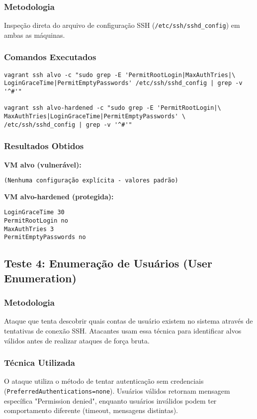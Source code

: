 \documentclass[12pt]{article}
\begin{document}
\subsubsection{Metodologia}
Inspeção direta do arquivo de configuração SSH (\texttt{/etc/ssh/sshd\_config}) em ambas as máquinas.

\subsubsection{Comandos Executados}
\begin{verbatim}
vagrant ssh alvo -c "sudo grep -E 'PermitRootLogin|MaxAuthTries|\
LoginGraceTime|PermitEmptyPasswords' /etc/ssh/sshd_config | grep -v '^#'"

vagrant ssh alvo-hardened -c "sudo grep -E 'PermitRootLogin|\
MaxAuthTries|LoginGraceTime|PermitEmptyPasswords' \
/etc/ssh/sshd_config | grep -v '^#'"
\end{verbatim}

\subsubsection{Resultados Obtidos}

\textbf{VM alvo (vulnerável):}
\begin{verbatim}
(Nenhuma configuração explícita - valores padrão)
\end{verbatim}

\textbf{VM alvo-hardened (protegida):}
\begin{verbatim}
LoginGraceTime 30
PermitRootLogin no
MaxAuthTries 3
PermitEmptyPasswords no
\end{verbatim}

\subsection{Teste 4: Enumeração de Usuários (User Enumeration)}

\subsubsection{Metodologia}
Ataque que tenta descobrir quais contas de usuário existem no sistema através de tentativas de conexão SSH. Atacantes usam essa técnica para identificar alvos válidos antes de realizar ataques de força bruta.

\subsubsection{Técnica Utilizada}
O ataque utiliza o método de tentar autenticação sem credenciais (\texttt{PreferredAuthentications=none}). Usuários válidos retornam mensagem específica "Permission denied", enquanto usuários inválidos podem ter comportamento diferente (timeout, mensagens distintas).
\end{document}

